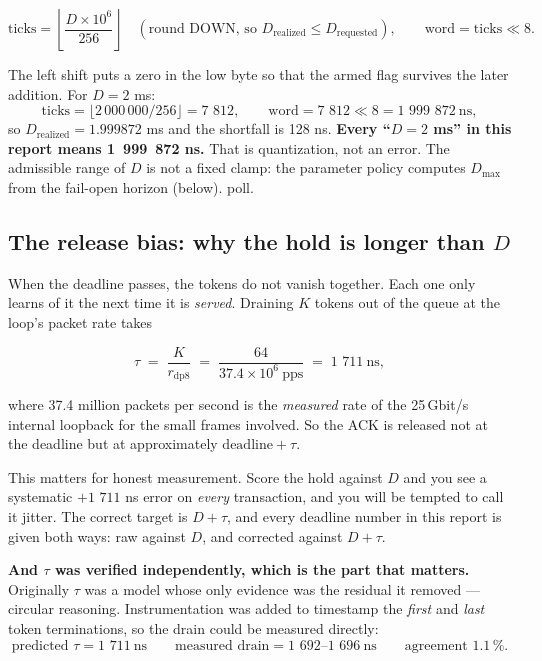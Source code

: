 \documentclass[10pt,a4paper,oneside]{article}
\newcommand{\num}[1]{\mbox{#1}}
\begin{document}
\begin{equation}
\text{ticks} = \left\lfloor\frac{D\times 10^{6}}{256}\right\rfloor \quad(\text{round DOWN, so } D_{\text{realized}}\le D_{\text{requested}}),
\qquad
\text{word} = \text{ticks} \ll 8 .
\label{eq:ticks}
\end{equation}

The left shift puts a zero in the low byte so that the armed flag survives the later
addition. For $D=2$ ms:
\[
\text{ticks} = \lfloor 2\,000\,000/256 \rfloor = \num{7 812},
\qquad
\text{word} = \num{7 812}\ll 8 = \num{1 999 872}\ \text{ns},
\]
so $D_{\text{realized}} = \num{1.999872}$ ms and the shortfall is \num{128} ns.
\textbf{Every ``$D=2$ ms'' in this report means \num{1 999 872} ns.} That is quantization,
not an error. The admissible range of $D$ is not a fixed clamp: the parameter policy computes $D_{\max}$ from the fail-open horizon (below). 
poll.

\subsection{The release bias: why the hold is longer than \texorpdfstring{$D$}{D}}

When the deadline passes, the tokens do not vanish together. Each one only learns of it the
next time it is \emph{served}. Draining $K$ tokens out of the queue at the loop's packet
rate takes

\begin{equation}
\tau \;=\; \frac{K}{r_{\mathrm{dp8}}}
      \;=\; \frac{64}{37.4\times 10^{6}\ \mathrm{pps}}
      \;=\; \num{1 711}\ \mathrm{ns},
\label{eq:tau}
\end{equation}

where \num{37.4} million packets per second is the \emph{measured} rate of the
25\,Gbit/s internal loopback for the small frames involved. So the ACK is released not at
the deadline but at approximately $\text{deadline}+\tau$.

This matters for honest measurement. Score the hold against $D$ and you see a systematic
$+\num{1 711}$ ns error on \emph{every} transaction, and you will be tempted to call it
jitter. The correct target is $D+\tau$, and every deadline number in this report is given
both ways: raw against $D$, and corrected against $D+\tau$.

\textbf{And $\tau$ was verified independently, which is the part that matters.} Originally
$\tau$ was a model whose only evidence was the residual it removed --- circular reasoning.
Instrumentation was added to timestamp the \emph{first} and \emph{last} token
terminations, so the drain could be measured directly:
\[
\text{predicted } \tau = \num{1 711}\ \text{ns}
\qquad
\text{measured drain} = \num{1 692}\text{--}\num{1 696}\ \text{ns}
\qquad
\text{agreement } 1.1\,\% .
\]
\end{document}
